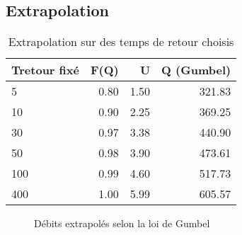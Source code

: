 \subsection{Extrapolation}
\begin{table}[H]
    \centering
    \begin{tabular}{l|r|r|r}
        \toprule
        \textbf{Tretour fixé} & \textbf{F(Q)} & \textbf{U} & \textbf{Q (Gumbel)} \\
        \midrule
        5                     & 0.80          & 1.50       & 321.83              \\
        10                    & 0.90          & 2.25       & 369.25              \\
        30                    & 0.97          & 3.38       & 440.90              \\
        50                    & 0.98          & 3.90       & 473.61              \\
        100                   & 0.99          & 4.60       & 517.73              \\
        400                   & 1.00          & 5.99       & 605.57              \\
        \bottomrule
    \end{tabular}
    \caption{Extrapolation sur des temps de retour choisis}
    \label{tab:gumbelcalcul_extrapolation}
\end{table}

\begin{figure}[H]
    \centering
    \caption{Débits extrapolés selon la loi de Gumbel}
    \label{graph:debits_gumbel_extrapole}
\end{figure}